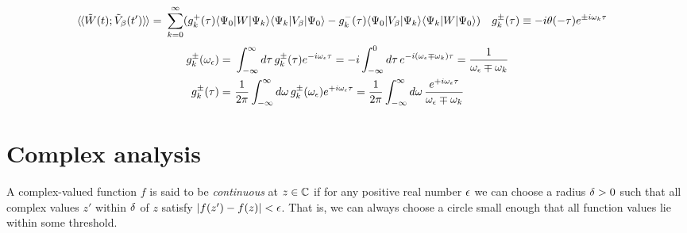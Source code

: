 \documentclass[11pt]{article}
\numberwithin{equation}{section}
\begin{document}
\begin{prop}
\label{prop:property-response-frequency-expansion}
%
\end{prop}


\begin{rmk}
\begin{align*}
\end{align*}
\end{rmk}

\begin{align}
  {\ensuremath{{\langle}\hspace{-1pt}{\langle}}} \tilde{W}(t);\tilde{V}_{\beta }(t') {{\rangle}\hspace{-1pt}{\rangle}}
=&\
  \sum_{k=0}^\infty
  (
    g_k^+(\tau )
    \langle\Psi _0|W|\Psi _k\rangle
    \langle\Psi _k|V_{\beta }|\Psi _0\rangle
  -
    g_k^-(\tau )
    \langle\Psi _0|V_{\beta }|\Psi _k\rangle
    \langle\Psi _k|W|\Psi _0\rangle
  )
&&
  g_k^{\pm}(\tau )
\equiv
-
  i
  \theta (-\tau )
    e^{\pm i\omega _k \tau }
\end{align}
\begin{align}
  g_k^\pm(\w_\ev)
=&\
  \int_{-\infty}^\infty
  d\ta\,
  g_k^\pm(\ta)
  e^{-i\w_\ev \ta}
=
-
  i
  \int_{-\infty}^0
  d\ta\,
  e^{-i(\w_\ev \mp \w_k) \ta}
=
  \fr{
    1
  }{
    \w_\ev \mp \w_k
  }
\\
  g_k^{\pm}(\ta)
=&\
  \fr{1}{2\pi}
  \int_{-\infty}^{\infty}
  d\w\,
  g_k^\pm(\w_\ev)
  e^{+i\w_\ev \ta}
=
  \fr{1}{2\pi}
  \int_{-\infty}^{\infty}
  d\w\,
  \fr{
    e^{+i\w_\ev \ta}
  }{
    \w_\ev \mp \w_k
  }
\end{align}

\newpage
\section{Complex analysis}

\begin{dfn}
A complex-valued function $f$ is said to be \textit{continuous} at $z\in\mathbb{C}$ if for any positive real number $\epsilon $ we can choose a radius $\delta >0$ such that all complex values $z'$ within $\delta $ of $z$ satisfy $|f(z')-f(z)|<\epsilon $.
That is, we can always choose a circle small enough that all function values lie within some threshold.
\end{dfn}
\end{document}
